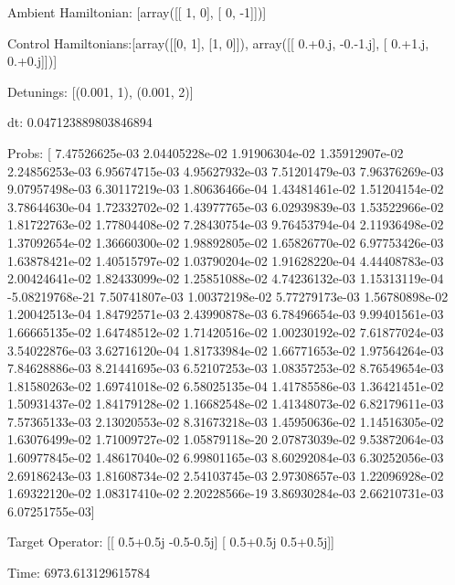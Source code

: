 \documentclass{article}
\begin{document}
    

\newpage

Ambient Hamiltonian: [array([[ 1,  0],
       [ 0, -1]])]

Control Hamiltonians:[array([[0, 1],
       [1, 0]]), array([[ 0.+0.j, -0.-1.j],
       [ 0.+1.j,  0.+0.j]])]

Detunings: [(0.001, 1), (0.001, 2)]

 dt: 0.047123889803846894

Probs: [  7.47526625e-03   2.04405228e-02   1.91906304e-02   1.35912907e-02
   2.24856253e-03   6.95674715e-03   4.95627932e-03   7.51201479e-03
   7.96376269e-03   9.07957498e-03   6.30117219e-03   1.80636466e-04
   1.43481461e-02   1.51204154e-02   3.78644630e-04   1.72332702e-02
   1.43977765e-03   6.02939839e-03   1.53522966e-02   1.81722763e-02
   1.77804408e-02   7.28430754e-03   9.76453794e-04   2.11936498e-02
   1.37092654e-02   1.36660300e-02   1.98892805e-02   1.65826770e-02
   6.97753426e-03   1.63878421e-02   1.40515797e-02   1.03790204e-02
   1.91628220e-04   4.44408783e-03   2.00424641e-02   1.82433099e-02
   1.25851088e-02   4.74236132e-03   1.15313119e-04  -5.08219768e-21
   7.50741807e-03   1.00372198e-02   5.77279173e-03   1.56780898e-02
   1.20042513e-04   1.84792571e-03   2.43990878e-03   6.78496654e-03
   9.99401561e-03   1.66665135e-02   1.64748512e-02   1.71420516e-02
   1.00230192e-02   7.61877024e-03   3.54022876e-03   3.62716120e-04
   1.81733984e-02   1.66771653e-02   1.97564264e-03   7.84628886e-03
   8.21441695e-03   6.52107253e-03   1.08357253e-02   8.76549654e-03
   1.81580263e-02   1.69741018e-02   6.58025135e-04   1.41785586e-03
   1.36421451e-02   1.50931437e-02   1.84179128e-02   1.16682548e-02
   1.41348073e-02   6.82179611e-03   7.57365133e-03   2.13020553e-02
   8.31673218e-03   1.45950636e-02   1.14516305e-02   1.63076499e-02
   1.71009727e-02   1.05879118e-20   2.07873039e-02   9.53872064e-03
   1.60977845e-02   1.48617040e-02   6.99801165e-03   8.60292084e-03
   6.30252056e-03   2.69186243e-03   1.81608734e-02   2.54103745e-03
   2.97308657e-03   1.22096928e-02   1.69322120e-02   1.08317410e-02
   2.20228566e-19   3.86930284e-03   2.66210731e-03   6.07251755e-03]

Target Operator: [[ 0.5+0.5j -0.5-0.5j]
 [ 0.5+0.5j  0.5+0.5j]]

Time: 6973.613129615784
\end{document}

